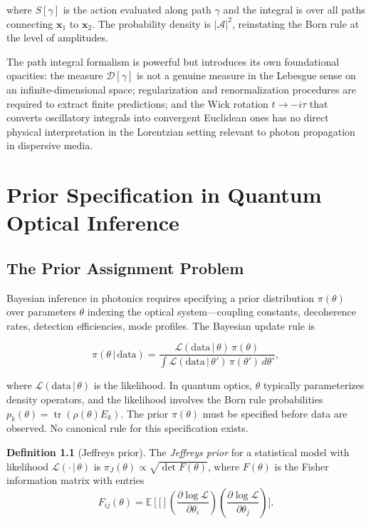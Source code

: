 \documentclass[11pt, openright, twoside]{book}
\theoremstyle{plain}
\theoremstyle{definition}
\newtheorem{definition}[theorem]{Definition}
\theoremstyle{remark}
\newcommand{\E}[1]{\mathbb{E}\!\left[#1\right]}
\newcommand{\given}{\,|\,}
\newcommand{\xvec}{\mathbf{x}}
\begin{document}
where $S[\gamma]$ is the action evaluated along path $\gamma$ and the integral is over all
paths connecting $\xvec_1$ to $\xvec_2$. The probability density is $|\mathcal{A}|^2$,
reinstating the Born rule at the level of amplitudes.

The path integral formalism is powerful but introduces its own foundational opacities: the
measure $\mathcal{D}[\gamma]$ is not a genuine measure in the Lebesgue sense on an
infinite-dimensional space; regularization and renormalization procedures are required to
extract finite predictions; and the Wick rotation $t \to -i\tau$ that converts oscillatory
integrals into convergent Euclidean ones has no direct physical interpretation in the Lorentzian
setting relevant to photon propagation in dispersive media.

\chapter{Prior Specification in Quantum Optical Inference}

\section{The Prior Assignment Problem}

Bayesian inference in photonics requires specifying a prior distribution $\pi(\theta)$ over
parameters $\theta$ indexing the optical system---coupling constants, decoherence rates,
detection efficiencies, mode profiles. The Bayesian update rule is

\begin{equation}
  \pi(\theta \given \text{data}) = \frac{\mathcal{L}(\text{data}\given\theta)\,\pi(\theta)}
  {\int \mathcal{L}(\text{data}\given\theta')\,\pi(\theta')\,d\theta'},
  \label{eq:bayes}
\end{equation}

where $\mathcal{L}(\text{data}\given\theta)$ is the likelihood. In quantum optics, $\theta$
typically parameterizes density operators, and the likelihood involves the Born rule
probabilities $p_k(\theta) = \operatorname{tr}(\rho(\theta)E_k)$. The prior $\pi(\theta)$
must be specified before data are observed. No canonical rule for this specification exists.

\begin{definition}[Jeffreys prior]
\label{def:jeffreys}
The \emph{Jeffreys prior} for a statistical model with likelihood $\mathcal{L}(\cdot\given\theta)$
is $\pi_J(\theta) \propto \sqrt{\det F(\theta)}$, where $F(\theta)$ is the Fisher information
matrix with entries
\begin{equation}
  F_{ij}(\theta) = \E[\left(\frac{\partial \log \mathcal{L}}{\partial\theta_i}\right)
  \left(\frac{\partial \log \mathcal{L}}{\partial\theta_j}\right)].
\end{equation}
\end{definition}
\end{document}
